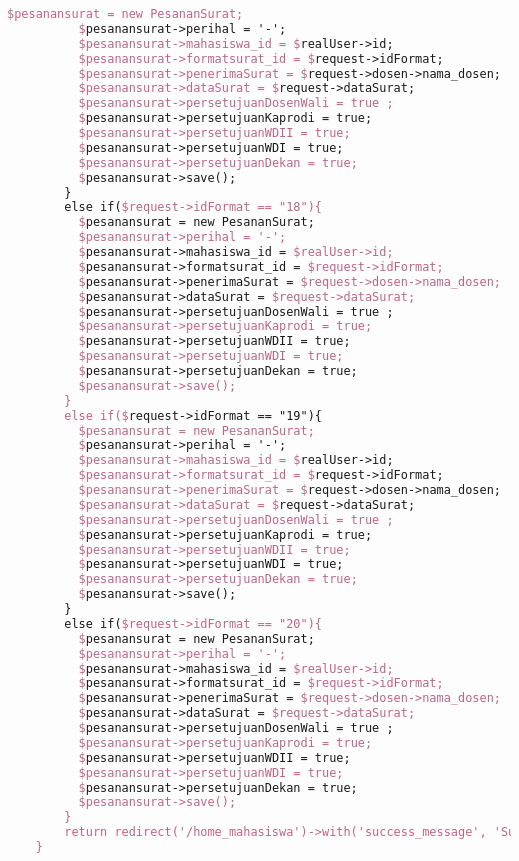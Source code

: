 \begin{lstlisting}[language=tex,basicstyle=\tiny,caption=PesanansuratController.php]
          $pesanansurat = new PesananSurat;
          $pesanansurat->perihal = '-';
          $pesanansurat->mahasiswa_id = $realUser->id;
          $pesanansurat->formatsurat_id = $request->idFormat;
          $pesanansurat->penerimaSurat = $request->dosen->nama_dosen;
          $pesanansurat->dataSurat = $request->dataSurat;
          $pesanansurat->persetujuanDosenWali = true ;
          $pesanansurat->persetujuanKaprodi = true;
          $pesanansurat->persetujuanWDII = true;
          $pesanansurat->persetujuanWDI = true;
          $pesanansurat->persetujuanDekan = true;
          $pesanansurat->save();
        }
        else if($request->idFormat == "18"){
          $pesanansurat = new PesananSurat;
          $pesanansurat->perihal = '-';
          $pesanansurat->mahasiswa_id = $realUser->id;
          $pesanansurat->formatsurat_id = $request->idFormat;
          $pesanansurat->penerimaSurat = $request->dosen->nama_dosen;
          $pesanansurat->dataSurat = $request->dataSurat;
          $pesanansurat->persetujuanDosenWali = true ;
          $pesanansurat->persetujuanKaprodi = true;
          $pesanansurat->persetujuanWDII = true;
          $pesanansurat->persetujuanWDI = true;
          $pesanansurat->persetujuanDekan = true;
          $pesanansurat->save();
        }
        else if($request->idFormat == "19"){
          $pesanansurat = new PesananSurat;
          $pesanansurat->perihal = '-';
          $pesanansurat->mahasiswa_id = $realUser->id;
          $pesanansurat->formatsurat_id = $request->idFormat;
          $pesanansurat->penerimaSurat = $request->dosen->nama_dosen;
          $pesanansurat->dataSurat = $request->dataSurat;
          $pesanansurat->persetujuanDosenWali = true ;
          $pesanansurat->persetujuanKaprodi = true;
          $pesanansurat->persetujuanWDII = true;
          $pesanansurat->persetujuanWDI = true;
          $pesanansurat->persetujuanDekan = true;
          $pesanansurat->save();
        }
        else if($request->idFormat == "20"){
          $pesanansurat = new PesananSurat;
          $pesanansurat->perihal = '-';
          $pesanansurat->mahasiswa_id = $realUser->id;
          $pesanansurat->formatsurat_id = $request->idFormat;
          $pesanansurat->penerimaSurat = $request->dosen->nama_dosen;
          $pesanansurat->dataSurat = $request->dataSurat;
          $pesanansurat->persetujuanDosenWali = true ;
          $pesanansurat->persetujuanKaprodi = true;
          $pesanansurat->persetujuanWDII = true;
          $pesanansurat->persetujuanWDI = true;
          $pesanansurat->persetujuanDekan = true;
          $pesanansurat->save();
        }
        return redirect('/home_mahasiswa')->with('success_message', 'Surat berhasil dibuat');
    }


\end{lstlisting}
